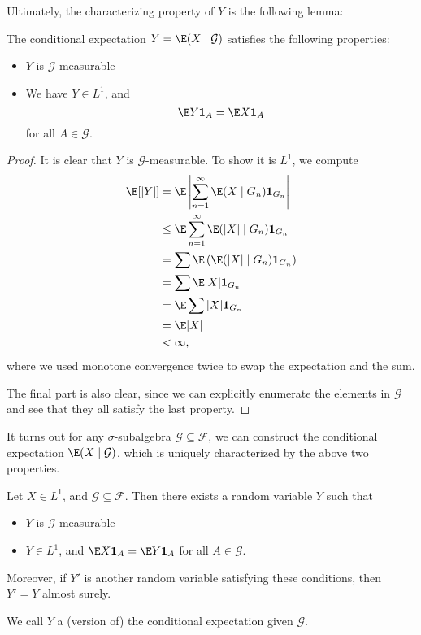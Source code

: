 \documentclass[a4paper]{article}
\begin{document}
Ultimately, the characterizing property of $Y$ is the following lemma:
\begin{lemma} 
  The conditional expectation $Y = \E(X \mid \mathcal{G})$ satisfies the following properties:
  \begin{itemize}
    \item $Y$ is $\mathcal{G}$-measurable
    \item We have $Y \in L^1$, and
      \[
        \E Y \mathbf{1}_A = \E X \mathbf{1}_A
      \]
      for all $A \in \mathcal{G}$.
  \end{itemize}
\end{lemma}

\begin{proof}
  It is clear that $Y$ is $\mathcal{G}$-measurable. To show it is $L^1$, we compute
  \begin{align*}
    \E[|Y|] &= \E \left|\sum_{n = 1}^\infty \E(X \mid G_n) \mathbf{1}_{G_n}\right|\\
    &\leq \E \sum_{n =1 }^\infty \E(|X| \mid G_n) \mathbf{1}_{G_n} \\
    &= \sum \E \left( \E(|X| \mid G_n) \mathbf{1}_{G_n}\right)\\
    &= \sum \E |X| \mathbf{1}_{G_n}\\
    &= \E \sum |X| \mathbf{1}_{G_n}\\
    &= \E |X|\\
    &< \infty,
  \end{align*}
  where we used monotone convergence twice to swap the expectation and the sum.

  The final part is also clear, since we can explicitly enumerate the elements in $\mathcal{G}$ and see that they all satisfy the last property.
\end{proof}

It turns out for any $\sigma$-subalgebra $\mathcal{G} \subseteq \mathcal{F}$, we can construct the conditional expectation $\E(X \mid \mathcal{G})$, which is uniquely characterized by the above two properties.

\begin{thm}
  Let $X \in L^1$, and $\mathcal{G} \subseteq \mathcal{F}$. Then there exists a random variable $Y$ such that
  \begin{itemize}
    \item $Y$ is $\mathcal{G}$-measurable
    \item $Y \in L^1$, and $\E X \mathbf{1}_A = \E Y \mathbf{1}_A$ for all $A \in \mathcal{G}$.
  \end{itemize}
  Moreover, if $Y'$ is another random variable satisfying these conditions, then $Y' = Y$ almost surely.

  We call $Y$ a (version of) the conditional expectation given $\mathcal{G}$.
\end{thm}
\end{document}
